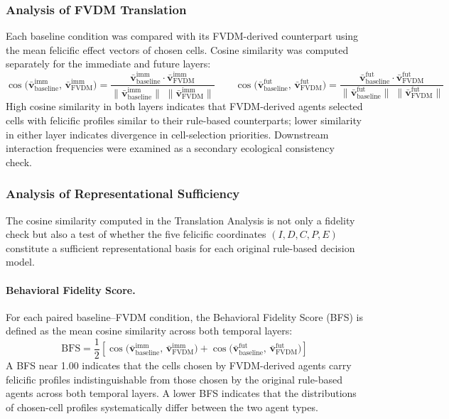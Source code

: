 \documentclass{icsthesis}
\begin{document}
\begin{mainmatter}
\subsubsection{Analysis of FVDM Translation}
Each baseline condition was compared with its FVDM-derived counterpart using the mean felicific effect vectors of chosen cells. Cosine similarity was computed separately for the immediate and future layers:
\[
\cos\!\bigl(\bar{\mathbf{v}}^{\mathrm{imm}}_{\text{baseline}},\, \bar{\mathbf{v}}^{\mathrm{imm}}_{\text{FVDM}}\bigr) = \frac{\bar{\mathbf{v}}^{\mathrm{imm}}_{\text{baseline}} \cdot \bar{\mathbf{v}}^{\mathrm{imm}}_{\text{FVDM}}}{\|\bar{\mathbf{v}}^{\mathrm{imm}}_{\text{baseline}}\|\;\|\bar{\mathbf{v}}^{\mathrm{imm}}_{\text{FVDM}}\|}
\qquad
\cos\!\bigl(\bar{\mathbf{v}}^{\mathrm{fut}}_{\text{baseline}},\, \bar{\mathbf{v}}^{\mathrm{fut}}_{\text{FVDM}}\bigr) = \frac{\bar{\mathbf{v}}^{\mathrm{fut}}_{\text{baseline}} \cdot \bar{\mathbf{v}}^{\mathrm{fut}}_{\text{FVDM}}}{\|\bar{\mathbf{v}}^{\mathrm{fut}}_{\text{baseline}}\|\;\|\bar{\mathbf{v}}^{\mathrm{fut}}_{\text{FVDM}}\|}
\]
High cosine similarity in both layers indicates that FVDM-derived agents selected cells with felicific profiles similar to their rule-based counterparts; lower similarity in either layer indicates divergence in cell-selection priorities. Downstream interaction frequencies were examined as a secondary ecological consistency check.

\subsubsection{Analysis of Representational Sufficiency}
The cosine similarity computed in the Translation Analysis is not only a fidelity check but also a test of whether the five felicific coordinates $(I, D, C, P, E)$ constitute a sufficient representational basis for each original rule-based decision model.

\paragraph{Behavioral Fidelity Score.}
For each paired baseline--FVDM condition, the Behavioral Fidelity Score (BFS) is defined as the mean cosine similarity across both temporal layers:
\[
\mathrm{BFS} = \frac{1}{2}\!\left[
  \cos\!\bigl(\bar{\mathbf{v}}^{\mathrm{imm}}_{\text{baseline}},\, \bar{\mathbf{v}}^{\mathrm{imm}}_{\text{FVDM}}\bigr)
  +
  \cos\!\bigl(\bar{\mathbf{v}}^{\mathrm{fut}}_{\text{baseline}},\, \bar{\mathbf{v}}^{\mathrm{fut}}_{\text{FVDM}}\bigr)
\right]
\]
A BFS near 1.00 indicates that the cells chosen by FVDM-derived agents carry felicific profiles indistinguishable from those chosen by the original rule-based agents across both temporal layers. A lower BFS indicates that the distributions of chosen-cell profiles systematically differ between the two agent types.


\end{mainmatter}
\end{document}
